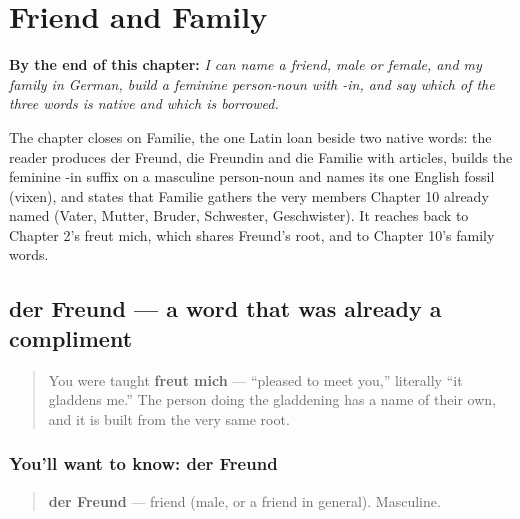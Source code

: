 
\chapter{Friend and Family}
\label{ch:ge-friend-and-family}

\begin{chapteropening}
\textbf{By the end of this chapter:} \emph{I can name a friend, male or female, and my family in German, build a feminine person-noun with -in, and say which of the three words is native and which is borrowed.}

The chapter closes on Familie, the one Latin loan beside two native words: the reader produces der Freund, die Freundin and die Familie with articles, builds the feminine -in suffix on a masculine person-noun and names its one English fossil (vixen), and states that Familie gathers the very members Chapter 10 already named (Vater, Mutter, Bruder, Schwester, Geschwister). It reaches back to Chapter 2's freut mich, which shares Freund's root, and to Chapter 10's family words.
\end{chapteropening}

\section[der Freund]{der Freund — a word that was already a compliment}

\label{lesson:GE-C29-freund}



\begin{quote}
You were taught \textbf{freut mich} — \textquotedblleft{}pleased to meet you,\textquotedblright{} literally \textquotedblleft{}it gladdens me.\textquotedblright{} The person doing the gladdening has a name of their own, and it is built from the very same root.
\end{quote}

\subsection*{You'll want to know: der Freund}
\begin{quote}
\textbf{der Freund} — friend (male, or a friend in general). Masculine.
\end{quote}

